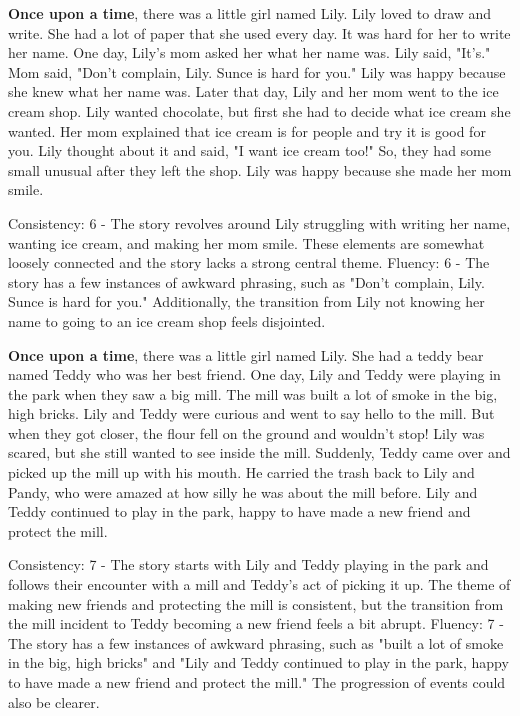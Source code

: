 \documentclass{article}
\begin{document}
\textbf{Once upon a time}, there was a little girl named Lily. Lily loved to draw and write. She had a lot of paper that she used every day. It was hard for her to write her name. One day, Lily's mom asked her what her name was. Lily said, "It's." Mom said, "Don't complain, Lily. Sunce is hard for you." Lily was happy because she knew what her name was. Later that day, Lily and her mom went to the ice cream shop. Lily wanted chocolate, but first she had to decide what ice cream she wanted. Her mom explained that ice cream is for people and try it is good for you. Lily thought about it and said, "I want ice cream too!" So, they had some small unusual after they left the shop. Lily was happy because she made her mom smile.

Consistency: 6 - The story revolves around Lily struggling with writing her name, wanting ice cream, and making her mom smile. These elements are somewhat loosely connected and the story lacks a strong central theme.
Fluency: 6 - The story has a few instances of awkward phrasing, such as "Don't complain, Lily. Sunce is hard for you." Additionally, the transition from Lily not knowing her name to going to an ice cream shop feels disjointed.

\textbf{Once upon a time}, there was a little girl named Lily. She had a teddy bear named Teddy who was her best friend. One day, Lily and Teddy were playing in the park when they saw a big mill. The mill was built a lot of smoke in the big, high bricks. Lily and Teddy were curious and went to say hello to the mill. But when they got closer, the flour fell on the ground and wouldn't stop! Lily was scared, but she still wanted to see inside the mill. Suddenly, Teddy came over and picked up the mill up with his mouth. He carried the trash back to Lily and Pandy, who were amazed at how silly he was about the mill before. Lily and Teddy continued to play in the park, happy to have made a new friend and protect the mill.

Consistency: 7 - The story starts with Lily and Teddy playing in the park and follows their encounter with a mill and Teddy's act of picking it up. The theme of making new friends and protecting the mill is consistent, but the transition from the mill incident to Teddy becoming a new friend feels a bit abrupt.
Fluency: 7 - The story has a few instances of awkward phrasing, such as "built a lot of smoke in the big, high bricks" and "Lily and Teddy continued to play in the park, happy to have made a new friend and protect the mill." The progression of events could also be clearer.
\end{document}
